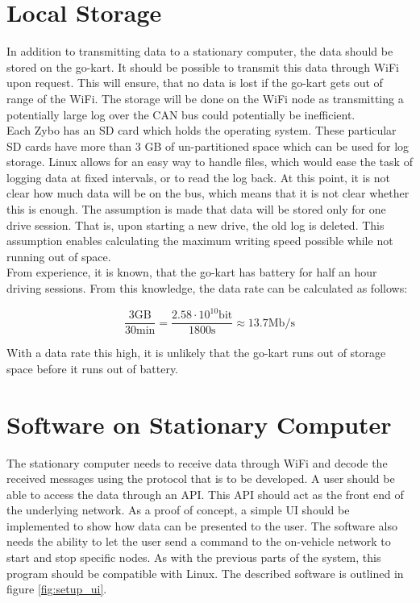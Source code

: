 
\section{Local Storage}
In addition to transmitting data to a stationary computer, the data should be stored on the go-kart.
It should be possible to transmit this data through WiFi upon request.
This will ensure, that no data is lost if the go-kart gets out of range of the WiFi.
The storage will be done on the WiFi node as transmitting a potentially large log over the CAN bus could potentially be inefficient.\\

Each Zybo has an SD card which holds the operating system.
These particular SD cards have more than 3 GB of un-partitioned space which can be used for log storage. 
Linux allows for an easy way to handle files, which would ease the task of logging data at fixed intervals, or to read the log back.
At this point, it is not clear how much data will be on the bus, which means that it is not clear whether this is enough.
The assumption is made that data will be stored only for one drive session.
That is, upon starting a new drive, the old log is deleted.
This assumption enables calculating the maximum writing speed possible while not running out of space.\\

From experience, it is known, that the go-kart has battery for half an hour driving sessions.
From this knowledge, the data rate can be calculated as follows:

\begin{equation}
	\frac{3\mathrm{GB}}{30\si{\minute}} = \frac{2.58 \cdot 10^{10} \mathrm{bit}}{1800 \si{\second}} \approx 13.7 \mathrm{Mb/s}
\end{equation}

With a data rate this high, it is unlikely that the go-kart runs out of storage space before it runs out of battery.

\section{Software on Stationary Computer}
The stationary computer needs to receive data through WiFi and decode the received messages using the protocol that is to be developed.
A user should be able to access the data through an API.
This API should act as the front end of the underlying network.
As a proof of concept, a simple UI should be implemented to show how data can be presented to the user.
The software also needs the ability to let the user send a command to the on-vehicle network to start and stop specific nodes.
As with the previous parts of the system, this program should be compatible with Linux.
The described software is outlined in figure \ref{fig:setup_ui}.

